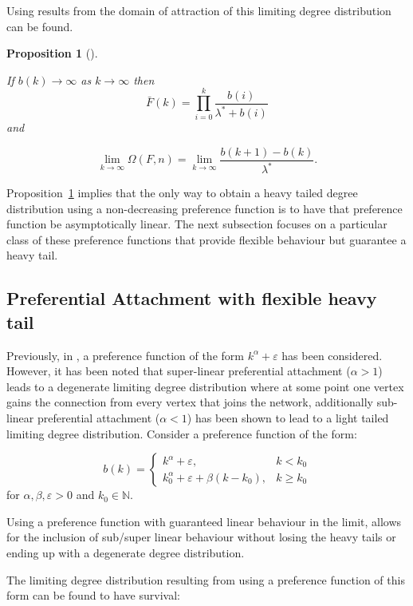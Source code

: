 \documentclass[
  sn-basic,
]{sn-jnl}
\theoremstyle{plain}
\newtheorem{proposition}{Proposition}[section]
\theoremstyle{remark}
\begin{document}
Using results from \citep{shimura12} the domain of attraction of this
limiting degree distribution can be found.

\begin{proposition}[]\protect\hypertarget{prp-omega}{}\label{prp-omega}

If \(b(k) \rightarrow \infty\) as \(k\rightarrow \infty\) then \[
\bar F(k) = \prod_{i=0}^k\frac{b(i)}{\lambda^* + b(i)}
\] and

\[
\lim_{k\rightarrow\infty}\Omega(F,n) = \lim_{k\rightarrow\infty}\frac{b(k+1)-b(k)}{\lambda^*}.
\]

\end{proposition}

Proposition~\ref{prp-omega} implies that the only way to obtain a heavy
tailed degree distribution using a non-decreasing preference function is
to have that preference function be asymptotically linear. The next
subsection focuses on a particular class of these preference functions
that provide flexible behaviour but guarantee a heavy tail.

\subsection{Preferential Attachment with flexible heavy
tail}\label{sec-model}

Previously, in \citep{krapivsky01}, a preference function of the form
\(k^\alpha +\varepsilon\) has been considered. However, it has been
noted that super-linear preferential attachment (\(\alpha > 1\)) leads
to a degenerate limiting degree distribution where at some point one
vertex gains the connection from every vertex that joins the network,
additionally sub-linear preferential attachment (\(\alpha <1\)) has been
shown to lead to a light tailed limiting degree distribution. Consider a
preference function of the form:

\[
b(k) = \begin{cases}
k^\alpha + \varepsilon,&k<k_0\\
k_0^\alpha + \varepsilon + \beta(k-k_0), &k\ge k_0
\end{cases}
\] for \(\alpha,\beta, \varepsilon>0\) and \(k_0\in\mathbb N\).

Using a preference function with guaranteed linear behaviour in the
limit, allows for the inclusion of sub/super linear behaviour without
losing the heavy tails or ending up with a degenerate degree
distribution.

The limiting degree distribution resulting from using a preference
function of this form can be found to have survival:
\end{document}
